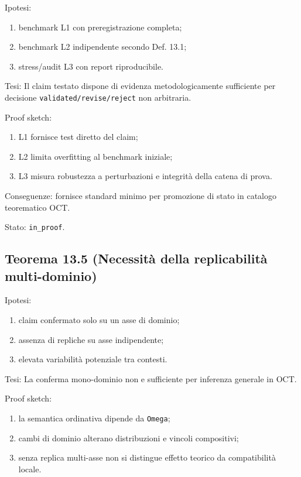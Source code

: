 Ipotesi:

\begin{enumerate}
\def\labelenumi{\arabic{enumi}.}
\tightlist
\item
  benchmark L1 con preregistrazione completa;
\item
  benchmark L2 indipendente secondo Def. 13.1;
\item
  stress/audit L3 con report riproducibile.
\end{enumerate}

Tesi:
Il claim testato dispone di evidenza metodologicamente sufficiente per decisione \texttt{validated/revise/reject} non arbitraria.

Proof sketch:

\begin{enumerate}
\def\labelenumi{\arabic{enumi}.}
\tightlist
\item
  L1 fornisce test diretto del claim;
\item
  L2 limita overfitting al benchmark iniziale;
\item
  L3 misura robustezza a perturbazioni e integrità della catena di prova.
\end{enumerate}

Conseguenze:
fornisce standard minimo per promozione di stato in catalogo teorematico OCT.

Stato: \texttt{in\_proof}.

\subsection{Teorema 13.5 (Necessità della replicabilità multi-dominio)}

Ipotesi:

\begin{enumerate}
\def\labelenumi{\arabic{enumi}.}
\tightlist
\item
  claim confermato solo su un asse di dominio;
\item
  assenza di repliche su asse indipendente;
\item
  elevata variabilità potenziale tra contesti.
\end{enumerate}

Tesi:
La conferma mono-dominio non e sufficiente per inferenza generale in OCT.

Proof sketch:

\begin{enumerate}
\def\labelenumi{\arabic{enumi}.}
\tightlist
\item
  la semantica ordinativa dipende da \texttt{Omega};
\item
  cambi di dominio alterano distribuzioni e vincoli compositivi;
\item
  senza replica multi-asse non si distingue effetto teorico da compatibilità locale.
\end{enumerate}

